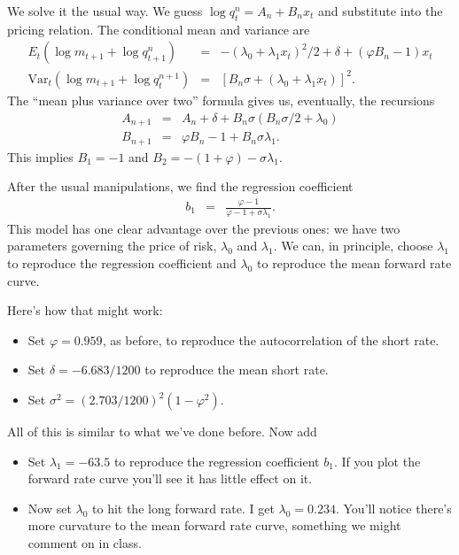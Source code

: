 \documentclass[11pt]{article}
\begin{document}
We solve it the usual way.
We guess  $ \log q^n_t = A_n + B_n x_t$ and substitute into the
pricing relation.
The conditional mean and variance are
\begin{eqnarray*}
   E_t \left( \log m_{t+1} + \log q^{n}_{t+1} \right) &=&
            - (\lambda_0 + \lambda_1 x_t)^2/2 + \delta + (\varphi B_n -1) x_t  \\
   \mbox{Var}_t \left( \log m_{t+1} + \log q^{n+1}_t \right) &=&
            \left[B_n \sigma + (\lambda_0 + \lambda_1 x_t)\right]^2  .
\end{eqnarray*}
The ``mean plus variance over two'' formula gives us, eventually,
the recursions
\begin{eqnarray*}
    A_{n+1} &=& A_n + \delta + B_n \sigma (B_n \sigma/2 + \lambda_0) \\
    B_{n+1} &=& \varphi B_n - 1 + B_n \sigma \lambda_1 .
\end{eqnarray*}
This implies
$B_1 = -1$ and $B_2 = -(1+\varphi) - \sigma \lambda_1 $.


After the usual manipulations,
we find the regression coefficient
\begin{eqnarray*}
    b_1 &=& \frac{\varphi-1}{\varphi-1+\sigma\lambda_1} .
\end{eqnarray*}
This model has one clear advantage over the previous ones:
we have two parameters governing the price of risk,
$\lambda_0$ and $\lambda_1$.
We can, in principle, choose $\lambda_1$ to reproduce
the regression coefficient and $\lambda_0$ to reproduce the
mean forward rate curve.

Here's how that might work:
%
\begin{itemize}
\item Set $\varphi = 0.959$, as before, to reproduce the
autocorrelation of the short rate.
\item Set $\delta = - 6.683/1200$ to reproduce the mean short rate.
\item Set $ \sigma^2 = (2.703/1200)^2 (1-\varphi^2)$.
\end{itemize}
All of this is similar to what we've done before.
Now add
\begin{itemize}
\item Set $\lambda_1=-63.5$ to reproduce the regression coefficient $b_1$.
If you plot the forward rate curve you'll see it has little effect on it.
\item Now set $\lambda_0$ to hit the long forward rate.  I get
$\lambda_0 = 0.234$.
You'll notice there's more curvature to the mean forward rate curve,
something we might comment on in class.
\end{itemize}
\end{document}

